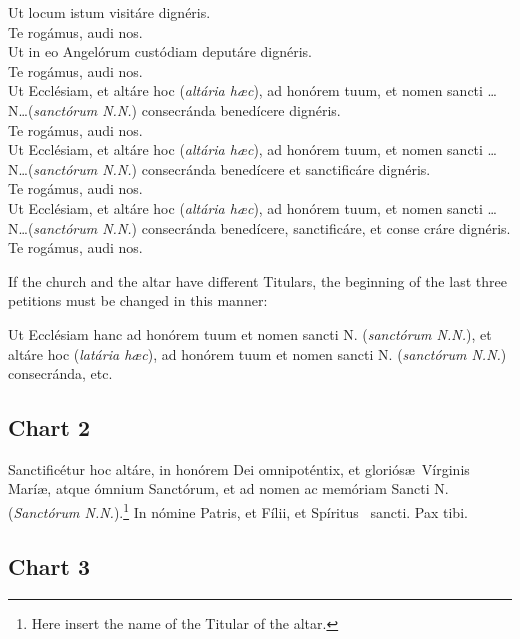 \documentclass[letterpaper]{report}
\begin{document}
{    \vbar Ut locum istum visit\'are dign\'eris.\\
    \rbar Te rog\'amus, audi nos.\\
    \vbar Ut in eo Angel\'orum cust\'odiam deput\'are dign\'eris.\\
    \rbar Te rog\'amus, audi nos.\\
    \vbar Ut Eccl\'esiam, et alt\'are hoc (\textit{alt\'aria h\ae c}), ad
    hon\'orem tuum, et nomen sancti \dots N\dots (\textit{sanct\'orum N.N.})
    consecr\'anda bene\cross d\'icere dign\'eris.\\
    \rbar Te rog\'amus, audi nos.\\
    \vbar Ut Eccl\'esiam, et alt\'are hoc (\textit{alt\'aria h\ae c}), ad
    hon\'orem tuum, et nomen sancti \dots N\dots (\textit{sanct\'orum N.N.})
    consecr\'anda bene\cross d\'icere et sancti\cross fic\'are dign\'eris.\\
    \rbar Te rog\'amus, audi nos.\\
    \vbar Ut Eccl\'esiam, et alt\'are hoc (\textit{alt\'aria h\ae c}), ad
    hon\'orem tuum, et nomen sancti \dots N\dots (\textit{sanct\'orum N.N.})
    consecr\'anda bene\cross d\'icere, sancti\cross fic\'are, et conse\cross
    cr\'are dign\'eris.\\
    \rbar Te rog\'amus, audi nos.

    If the church and the altar have different Titulars, the beginning of the
    last three petitions must be changed in this manner:

    Ut Eccl\'esiam hanc ad hon\'orem tuum et nomen sancti N.
    (\textit{sanct\'orum N.N.}), et alt\'are hoc (\textit{lat\'aria h\ae c}),
    ad hon\'orem tuum et nomen sancti N. (\textit{sanct\'orum N.N.})
    consecr\'anda, etc.

    \subsection*{Chart 2}

    Sancti\cross fic\'etur hoc alt\'are, in hon\'orem Dei omnipot\'entix, et
    glori\'os\ae\ V\'irginis Mar\'i\ae, atque \'omnium Sanct\'orum, et ad nomen
    ac mem\'oriam Sancti N. (\textit{Sanct\'orum N.N.}).\footnote{Here insert
    the name of the Titular of the altar.} In n\'omine Pa\cross tris, et
    F\'i\cross lii, et Sp\'iritus \cross\ sancti. Pax tibi.

    \subsection*{Chart 3}

}
\end{document}
